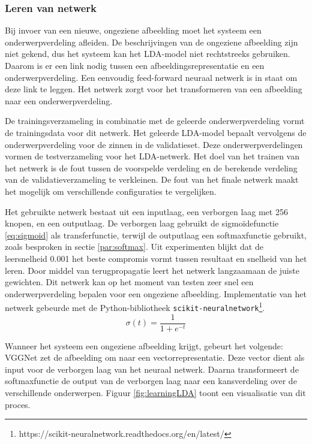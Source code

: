 \subsubsection{Leren van netwerk}
\label{sec:LDAprediction}
Bij invoer van een nieuwe, ongeziene afbeelding moet het systeem een onderwerpverdeling afleiden. De beschrijvingen van de ongeziene afbeelding zijn niet gekend, dus het systeem kan het LDA-model niet rechtstreeks gebruiken. Daarom is er een link nodig tussen een afbeeldingsrepresentatie en een onderwerpverdeling. Een eenvoudig feed-forward neuraal netwerk is in staat om deze link te leggen. 
Het netwerk zorgt voor het transformeren van een afbeelding naar een onderwerpverdeling.

De trainingsverzameling in combinatie met de geleerde onderwerpverdeling vormt de trainingsdata voor dit netwerk. 
Het geleerde LDA-model bepaalt vervolgens de onderwerpverdeling voor de zinnen in de validatieset. Deze onderwerpverdelingen vormen de testverzameling voor het LDA-netwerk. Het doel van het trainen van het netwerk is de fout tussen de voorspelde verdeling en de berekende verdeling van de validatieverzameling te verkleinen. De fout van het finale netwerk maakt het mogelijk om verschillende configuraties te vergelijken.

Het gebruikte netwerk bestaat uit een inputlaag, een verborgen laag met 256 knopen, en een outputlaag. De verborgen laag gebruikt de sigmo\"idefunctie \eqref{eq:sigmoid} als transferfunctie, terwijl de outputlaag een softmaxfunctie gebruikt, zoals besproken in sectie \ref{par:softmax}. Uit experimenten blijkt dat de leersnelheid 0.001 het beste compromis vormt tussen resultaat en snelheid van het leren.
Door middel van terugpropagatie leert het netwerk langzaamaan de juiste gewichten. Dit netwerk kan op het moment van testen zeer snel een onderwerpverdeling bepalen voor een ongeziene afbeelding. Implementatie van het netwerk gebeurde met de Python-bibliotheek \texttt{scikit-neuralnetwork}\footnote{https://scikit-neuralnetwork.readthedocs.org/en/latest/}.
\begin{equation}
\sigma(t) = \frac{1}{1 + e^{-t}}
\label{eq:sigmoid}
\end{equation}

Wanneer het systeem een ongeziene afbeelding krijgt, gebeurt het volgende: VGGNet zet de afbeelding om naar een vectorrepresentatie. Deze vector dient als input voor de verborgen laag van het neuraal netwerk. Daarna transformeert de softmaxfunctie de output van de verborgen laag naar een kansverdeling over de verschillende onderwerpen. Figuur \ref{fig:learningLDA} toont een visualisatie van dit proces.


